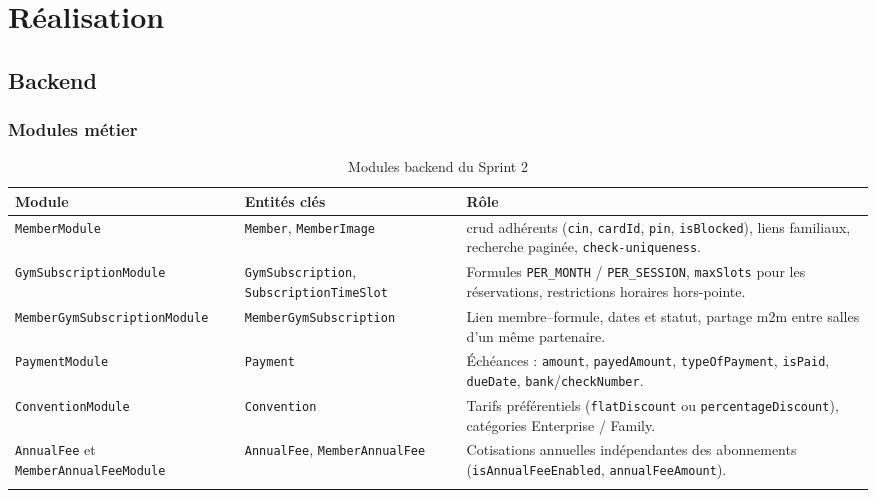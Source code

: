﻿\documentclass[../main.tex]{subfiles}
\begin{document}
\section{R\'{e}alisation}

\subsection{Backend}

\subsubsection{Modules m\'{e}tier}

\begin{longtable}{|>{\footnotesize}p{5.5cm}|>{\footnotesize}p{4.0cm}|p{3.8cm}|}
\hline
\textbf{Module} & \textbf{Entit\'{e}s cl\'{e}s} & \textbf{R\^{o}le} \\
\hline
\endfirsthead
\hline
\endfoot
\texttt{MemberModule} & \texttt{Member}, \texttt{MemberImage} & \acrshort{crud} adh\'{e}rents (\texttt{cin}, \texttt{cardId}, \texttt{pin}, \texttt{isBlocked}), liens familiaux, recherche pagin\'{e}e, \texttt{check-uniqueness}. \\
\hline
\texttt{GymSubscriptionModule} & \texttt{GymSubscription}, \texttt{SubscriptionTimeSlot} & Formules \texttt{PER\_MONTH} / \texttt{PER\_SESSION}, \texttt{maxSlots} pour les r\'{e}servations, restrictions horaires hors-pointe. \\
\hline
\texttt{MemberGymSubscriptionModule} & \texttt{MemberGymSubscription} & Lien membre--formule, dates et statut, partage \acrshort{m2m} entre salles d'un m\^{e}me partenaire. \\
\hline
\texttt{PaymentModule} & \texttt{Payment} & \'{E}ch\'{e}ances : \texttt{amount}, \texttt{payedAmount}, \texttt{typeOfPayment}, \texttt{isPaid}, \texttt{dueDate}, \texttt{bank}/\texttt{checkNumber}. \\
\hline
\texttt{ConventionModule} & \texttt{Convention} & Tarifs pr\'{e}f\'{e}rentiels (\texttt{flatDiscount} ou \texttt{percentageDiscount}), cat\'{e}gories Enterprise / Family. \\
\hline
\texttt{AnnualFee} et \texttt{MemberAnnualFeeModule} & \texttt{AnnualFee}, \texttt{MemberAnnualFee} & Cotisations annuelles ind\'{e}pendantes des abonnements (\texttt{isAnnualFeeEnabled}, \texttt{annualFeeAmount}). \\
\hline
\caption{Modules backend du Sprint 2}
\end{longtable}
\end{document}
